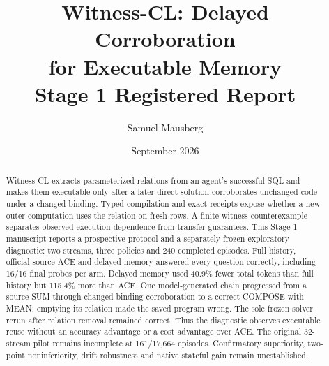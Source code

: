 \documentclass[10pt,twocolumn]{article}
\title{\vspace{-1.2em}\textbf{Witness-CL: Delayed Corroboration\\for Executable Memory}\\[.3em]\large Stage 1 Registered Report}
\author{Samuel Mausberg}\date{September 2026}
\begin{document}
\raggedbottom\maketitle
\begin{abstract}
Witness-CL extracts parameterized relations from an agent's successful SQL and
makes them executable only after a later direct solution corroborates unchanged
code under a changed binding. Typed compilation and exact receipts expose
whether a new outer computation uses the relation on fresh rows. A finite-witness
counterexample separates observed execution dependence from transfer guarantees.
This Stage 1 manuscript reports a prospective protocol and a separately frozen
exploratory diagnostic: two streams, three policies and 240 completed episodes.
Full history, official-source ACE and delayed memory answered every question
correctly, including 16/16 final probes per arm. Delayed memory used 40.9\% fewer
total tokens than full history but 115.4\% more than ACE. One model-generated
chain progressed from a source SUM through changed-binding corroboration to a
correct COMPOSE with MEAN; emptying its relation made the saved program wrong.
The sole frozen solver rerun after relation removal remained correct.
Thus the diagnostic observes executable reuse without an accuracy advantage or
a cost advantage over ACE. The original 32-stream pilot remains incomplete at
161/17,664 episodes. Confirmatory superiority, two-point noninferiority, drift
robustness and native stateful gain remain unestablished.
\end{abstract}
\noindent{}
\end{document}
